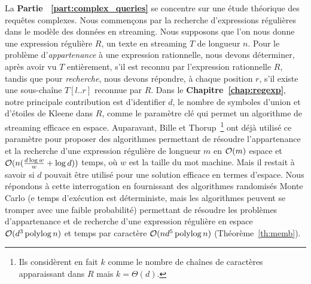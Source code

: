 La \textbf{Partie ~\ref{part:complex_queries}} se concentre sur une étude théorique des requêtes complexes.
Nous commençons par la recherche d'expressions régulières dans le modèle des données en streaming.
%
Nous supposons que l'on nous donne une expression régulière $R$, un texte en streaming $T$ de longueur $n$. Pour le problème d'\emph{appartenance} à une expression rationnelle, nous devons déterminer, après avoir vu $T$ entièrement, s'il est reconnu par l'expression rationnelle $R$, tandis que pour \emph{recherche}, nous devons répondre, à chaque position $r$, s'il existe une sous-chaîne $T[l..r]$ reconnue par $R$.
Dans le \textbf{Chapitre~\ref{chap:regexp}}, notre principale contribution est d'identifier $d$, le nombre de symboles d'union et d'étoiles de Kleene dans $R$, comme le paramètre clé qui permet un algorithme de streaming efficace en espace. 
Auparavant, Bille et Thorup~\cite{doi:10.1137/1.9781611973075.104}\footnote{Ils considèrent en fait $k$ comme le nombre de chaînes de caractères apparaissant dans $R$ mais $k=\Theta(d)$. } ont déjà utilisé ce paramètre pour proposer des algorithmes permettant de résoudre l'appartenance et la recherche d'une expression régulière de longueur $m$ en $\mathcal{O}(m)$ espace et $\mathcal{O}(n(\frac{d\log w}{w} + \log d))$ temps, où $w$ est la taille du mot machine. Mais il restait à savoir si $d$ pouvait être utilisé pour une solution efficace en termes d'espace.
%
Nous répondons à cette interrogation en fournissant des algorithmes randomisés Monte Carlo (e temps d'exécution est déterministe, mais les algorithmes peuvent se tromper avec une faible probabilité) permettant de résoudre les problèmes d'appartenance et de recherche d'une expression régulière en espace $\mathcal{O}(d^3\operatorname{polylog} n)$  et temps par caractère  $\mathcal{O}(nd^5\operatorname{polylog} n)$  (Théorème~\ref{th:memb}).

